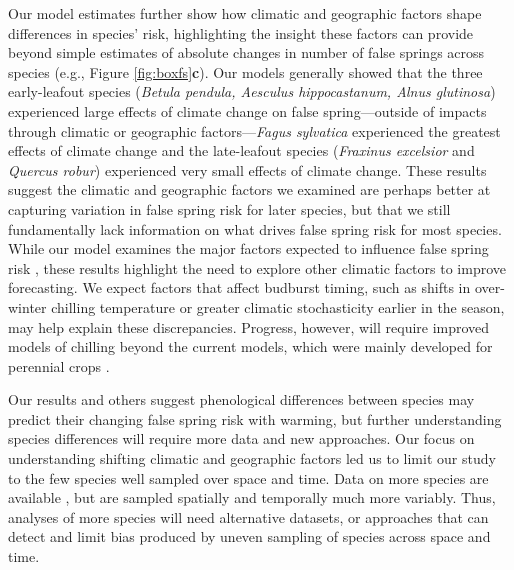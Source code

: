 \documentclass{article}\usepackage[]{graphicx}\usepackage[]{color}
\begin{document}
Our model estimates further show how climatic and geographic factors shape differences in species' risk, highlighting the insight these factors can provide beyond simple estimates of absolute changes in number of false springs across species (e.g., Figure \ref{fig:boxfs}\textbf{c}). Our models generally showed that the three early-leafout species (\textit{Betula pendula, Aesculus hippocastanum, Alnus glutinosa}) experienced large effects of climate change on false spring---outside of impacts through climatic or geographic factors---\textit{Fagus sylvatica} experienced the greatest effects of climate change and the late-leafout species (\textit{Fraxinus excelsior} and \textit{Quercus robur}) experienced very small effects of climate change. These results suggest the climatic and geographic factors we examined are perhaps better at capturing variation in false spring risk for later species, but that we still fundamentally lack information on what drives false spring risk for most species. While our model examines the major factors expected to influence false spring risk \citep{Wypych2016a,Liu2018,Ma2018,Vitasse2018}, these results highlight the need to explore other climatic factors to improve forecasting. We expect factors that affect budburst timing, such as shifts in over-winter chilling temperature or greater climatic stochasticity earlier in the season, may help explain these discrepancies. Progress, however, will require improved models of chilling beyond the current models, which were mainly developed for perennial crops \citep{Dennis2003,Luedeling2011}. 

Our results and others \citep{Ma2018} suggest phenological differences between species may predict their changing false spring risk with warming, but further understanding species differences will require more data and new approaches. Our focus on understanding shifting climatic and geographic factors led us to limit our study to the few species well sampled over space and time. Data on more species are available \citep[e.g., ][]{Ma2018}, but are sampled spatially and temporally much more variably. Thus, analyses of more species will need alternative datasets, or approaches that can detect and limit bias produced by uneven sampling of species across space and time.
\end{document}
